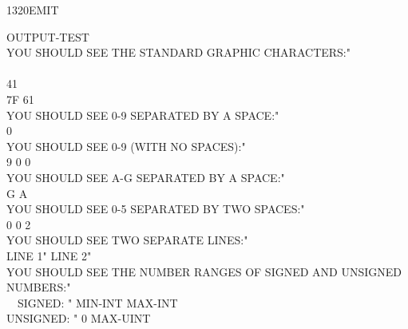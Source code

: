\begin{worddef}{1320}{EMIT}
	\begin{testing} %
		\ttfamily
		\word{:} OUTPUT-TEST \\[1ex]
		\tab   {} YOU SHOULD SEE THE STANDARD GRAPHIC CHARACTERS:"  \\
		       \\
		 41      \\
		\tab   7F 61      \\[1ex]
		\tab   {} YOU SHOULD SEE 0-9 SEPARATED BY A SPACE:"  \\
		  0      \\[1ex]
		\tab   {} YOU SHOULD SEE 0-9 (WITH NO SPACES):"  \\
		\tab   \word{[CHAR]} 9  \word{[CHAR]} 0
			  0     \\[1ex]
		\tab   {} YOU SHOULD SEE A-G SEPARATED BY A SPACE:"  \\
		\tab   \word{[CHAR]} G  \word{[CHAR]} A
			      \\[1ex]
		\tab   {} YOU SHOULD SEE 0-5 SEPARATED BY TWO SPACES:"  \\
		  0
			  \word{[CHAR]} 0 \word{+}  2    \\[1ex]
		\tab   {} YOU SHOULD SEE TWO SEPARATE LINES:"  \\
		\tab   {} LINE 1"    LINE 2"   \\[1ex]
		\tab   {} {\small YOU SHOULD SEE THE NUMBER RANGES OF SIGNED AND UNSIGNED NUMBERS:}"  \\
		\tab   {} ~~SIGNED: " MIN-INT  MAX-INT   \\
		\tab   {} UNSIGNED: " 0  MAX-UINT   \\
		\word{;}

	\end{testing}
\end{worddef}

